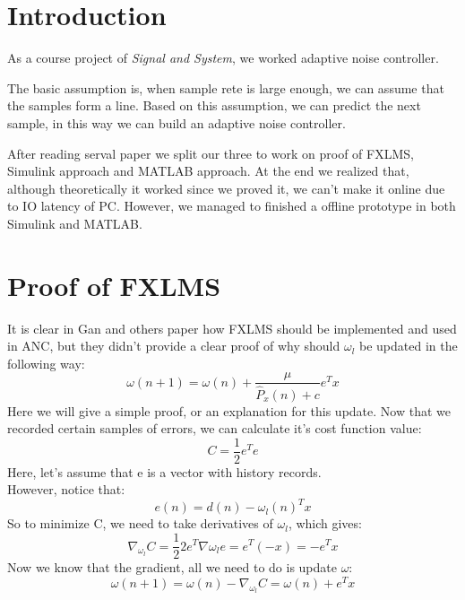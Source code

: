 \documentclass[conference,compsoc]{IEEEtran}
\begin{document}




\maketitle
%
\IEEEpeerreviewmaketitle


\section{Introduction}
	As a course project of \emph{Signal and System}, we worked adaptive noise controller.
\par
	The basic assumption is, 
	when sample rete is large enough, we can assume that the samples form a line.
	Based on this assumption, we can predict the next sample, 
	in this way we can build an adaptive noise controller.
\par 
	After reading serval paper we split our three to work on proof of FXLMS, Simulink approach and 
	MATLAB approach. At the end we realized that, 
	although theoretically it worked since we proved it, 
	we can't make it online due to IO latency of PC.
	However, we managed to finished a offline prototype in both Simulink and MATLAB.
\section{Proof of FXLMS}
\par
	It is clear in Gan and others paper\cite{Gan2005Adaptive,Song2005Robust} how FXLMS should be implemented and used in ANC, but they didn't provide a clear proof of why should $\omega_l$ be updated in the following way:
	$$\omega(n+1) = \omega(n) + \frac{\mu}{\widehat P_x(n)+c}e^Tx$$
	Here we will give a simple proof, or an explanation for this update.
	Now that we recorded certain samples of errors, we can calculate it's cost function value:
	$$ C =\frac{1}{2} e^Te $$
	Here, let's assume that e is a vector with history records. \\
	However, notice that:
	$$ e(n) = d(n) - \omega_l(n)^T x$$
	So to minimize C, we need to take derivatives of $\omega_l$, which gives:
	$$ \nabla_{\omega_l} C = \frac{1}{2}2e^T\nabla{\omega_l} e = e^T(-x) = -e^Tx $$
	Now we know that the gradient, all we need to do is update $\omega$:
	$$ \omega(n+1) = \omega(n) - \nabla_{\omega_l} C = \omega(n) + e^Tx $$
	
\end{document}
